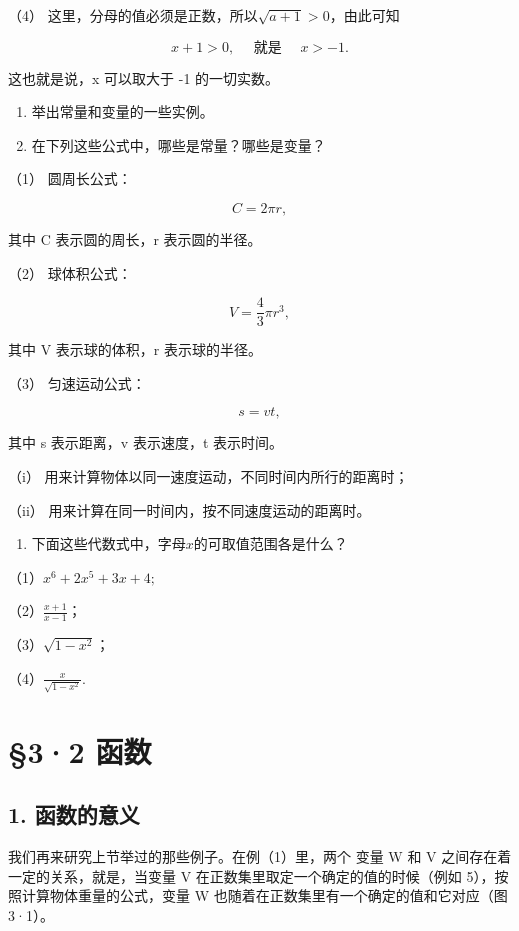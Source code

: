（4） 这里，分母的值必须是正数，所以\(\sqrt{a + 1} > 0\)，由此可知

\[
x + 1 > 0, \quad \text{ 就是 } \quad x > - 1.
\]

这也就是说，x 可以取大于 -1 的一切实数。

\begin{enumerate}
\item
  举出常量和变量的一些实例。
\item
  在下列这些公式中，哪些是常量？哪些是变量？
\end{enumerate}

（1） 圆周长公式：

\[
C = 2 \pi r,
\]

其中 C 表示圆的周长，r 表示圆的半径。

（2） 球体积公式：

\[
V = \frac{4}{3} \pi r^{3},
\]

其中 V 表示球的体积，r 表示球的半径。

（3） 匀速运动公式：

\[
s = v t,
\]

其中 s 表示距离，v 表示速度，t 表示时间。

（i） 用来计算物体以同一速度运动，不同时间内所行的距离时；

（ii） 用来计算在同一时间内，按不同速度运动的距离时。

\begin{enumerate}[start=3]
\item
  下面这些代数式中，字母\(x\)的可取值范围各是什么？
\end{enumerate}

（1）\(x^{6} + 2x^{5} + 3x + 4;\)

（2）\(\frac{x + 1}{x - 1}\)；

（3）\(\sqrt{1 - x^2}\)；

（4）\(\frac{x}{\sqrt{1 - x^2}}.\)

\section{§3·2 函数}

\subsection{1. 函数的意义}

我们再来研究上节举过的那些例子。在例（1）里，两个 变量 W 和 V
之间存在着一定的关系，就是，当变量 V
在正数集里取定一个确定的值的时候（例如 5），按照计算物体重量的公式，变量
W 也随着在正数集里有一个确定的值和它对应（图3·1）。

